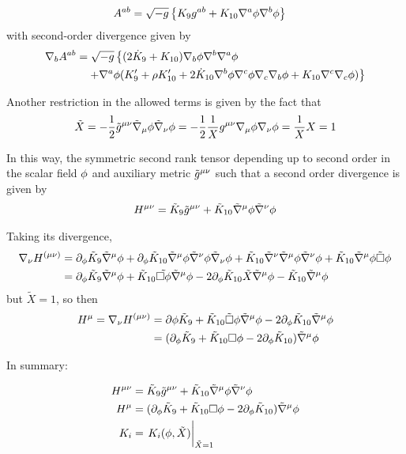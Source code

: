 \begin{equation}
\begin{split}
  A^{ab}&=\sqrt{-g}\left\{K_9g^{ab}+K_{10}\nabla^{a}\phi\nabla^b\phi  \right\}
\end{split}
\end{equation}
with second-order divergence given by
\begin{align}
   \nabla_b A^{ab}&= \sqrt{-g}\left\{(2\dot{K}_9+K_{10})\nabla_b\phi \nabla^b\nabla^{a}\phi\right. \\
  &\quad\left.+\nabla^{a}\phi (K_9'+\rho K_{10}'+2\dot{K}_{10}\nabla^b\phi \nabla^c\phi \nabla_c\nabla_b\phi +K_{10}\nabla^c\nabla_c\phi )\right\}
\end{align}

Another restriction in the allowed terms is given by the fact that
\begin{align}
  \tilde{X}=-\frac{1}{2}\tilde{g}^{\mu\nu }\tilde{\nabla}_\mu\phi \tilde{\nabla}_\nu\phi =-\frac{1}{2}\frac{1}{X}g^{\mu\nu }\nabla_\mu\phi \nabla_\nu\phi=\frac{1}{X}X=1
\end{align}


In this way, the symmetric second rank tensor depending up to second order in the scalar field $\phi$ and auxiliary metric $\tilde{g}^{\mu\nu}$ such that a second order divergence is given by
\begin{align}
  H^{\mu\nu}=\tilde{K}_9\tilde{g}^{\mu\nu }+\tilde{K}_{10}\tilde{\nabla}^\mu\phi\tilde{\nabla}^\nu\phi 
\end{align}

Taking its divergence,
\begin{align}
  \nabla_\nu H^{(\mu\nu)}&=\partial_\phi\tilde{K}_9\tilde{\nabla}^\mu\phi +\partial_\phi\tilde{K}_{10}\tilde{\nabla}^\mu\phi \tilde{\nabla}^\nu\phi \tilde{\nabla}_\nu\phi +\tilde{K}_{10}\tilde{\nabla}^\nu\tilde{\nabla}^\mu\phi\tilde{\nabla}^\nu\phi +\tilde{K}_{10}\tilde{\nabla}^\mu\phi\tilde{\Box}\phi \\
  &=\partial_\phi \tilde{K}_9\tilde{\nabla}^\mu\phi +\tilde{K}_{10}\tilde{\Box\phi }\tilde{\nabla}^\mu\phi -2\partial_\phi\tilde{K}_{10}\tilde{X}\tilde{\nabla}^\mu\phi -\tilde{K}_{10}\tilde{\nabla}^\mu\phi 
\end{align}
but $\tilde{X}=1$, so then
\begin{align}
  H^\mu = \nabla_\nu H^{(\mu\nu)}&=\partial\phi\tilde{K}_9+\tilde{K}_{10}\tilde{\Box}\phi\tilde{\nabla}^\mu\phi  -2\partial_\phi \tilde{K}_{10}\tilde{\nabla}^\mu\phi \\
   &=(\partial_\phi\tilde{K}_9+\tilde{K}_{10}\Box\phi -2\partial_\phi \tilde{K}_{10})\tilde{\nabla}^\mu\phi 
\end{align}

In summary:
\begin{tcolorbox}
	\begin{align}
  H^{\m\n}&=\tilde{K}_9\tilde{g}^{\m\n }+\tilde{K}_{10}\tn^\m\f\tn^\n\f \\
  H^\m &=(\partial_\f\tilde{K}_9+\tilde{K}_{10}\Box\f -2\partial_\f \tilde{K}_{10})\tn^\m\f \\
  K_i&=\eval{K_i(\f,\tilde{X})}_{\tilde{X}=1}
\end{align}
\end{tcolorbox}




